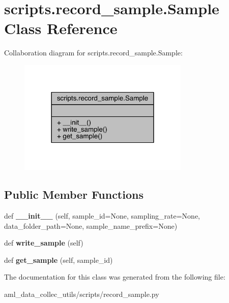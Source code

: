 \hypertarget{classscripts_1_1record__sample_1_1_sample}{}\section{scripts.\+record\+\_\+sample.\+Sample Class Reference}
\label{classscripts_1_1record__sample_1_1_sample}


Collaboration diagram for scripts.\+record\+\_\+sample.\+Sample\+:\nopagebreak
\begin{figure}[H]
\begin{center}
\leavevmode
\includegraphics[width=230pt]{classscripts_1_1record__sample_1_1_sample__coll__graph}
\end{center}
\end{figure}
\subsection*{Public Member Functions}
\begin{DoxyCompactItemize}
\item 
\hypertarget{classscripts_1_1record__sample_1_1_sample_abf1bb946fdba0395cb29692dc349de68}{}\label{classscripts_1_1record__sample_1_1_sample_abf1bb946fdba0395cb29692dc349de68} 
def {\bfseries \+\_\+\+\_\+init\+\_\+\+\_\+} (self, sample\+\_\+id=None, sampling\+\_\+rate=None, data\+\_\+folder\+\_\+path=None, sample\+\_\+name\+\_\+prefix=None)
\item 
\hypertarget{classscripts_1_1record__sample_1_1_sample_a13a4307fc8680299a56b3cd3d594183d}{}\label{classscripts_1_1record__sample_1_1_sample_a13a4307fc8680299a56b3cd3d594183d} 
def {\bfseries write\+\_\+sample} (self)
\item 
\hypertarget{classscripts_1_1record__sample_1_1_sample_a724504b105b54701a9c77382a3824029}{}\label{classscripts_1_1record__sample_1_1_sample_a724504b105b54701a9c77382a3824029} 
def {\bfseries get\+\_\+sample} (self, sample\+\_\+id)
\end{DoxyCompactItemize}


The documentation for this class was generated from the following file\+:\begin{DoxyCompactItemize}
\item 
aml\+\_\+data\+\_\+collec\+\_\+utils/scripts/record\+\_\+sample.\+py\end{DoxyCompactItemize}
